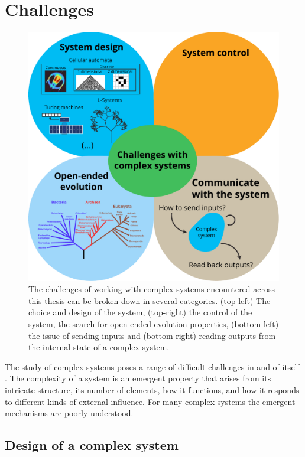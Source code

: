 \section{Challenges}

\begin{figure}[htbp]
  \centering
  \includegraphics[width=.9\linewidth]{figures/challenges}
  \caption{The challenges of working with complex systems encountered across
    this thesis can be broken down in several categories. (top-left) The choice
    and design of the system, (top-right) the control of the system, the search
    for open-ended evolution properties, (bottom-left) the issue of sending
    inputs and (bottom-right) reading outputs from the internal state of a
    complex system.}
  \label{fig:challenges}
\end{figure}

The study of complex systems poses a range of difficult challenges in and of
itself \parencite{sanmiguelChallengesComplexSystems2012}. The complexity of a system
is an emergent property that arises from its intricate structure, its number of
elements, how it functions, and how it responds to different kinds of external
influence. For many complex systems the emergent mechanisms are poorly
understood.


\subsection{Design of a complex system}

